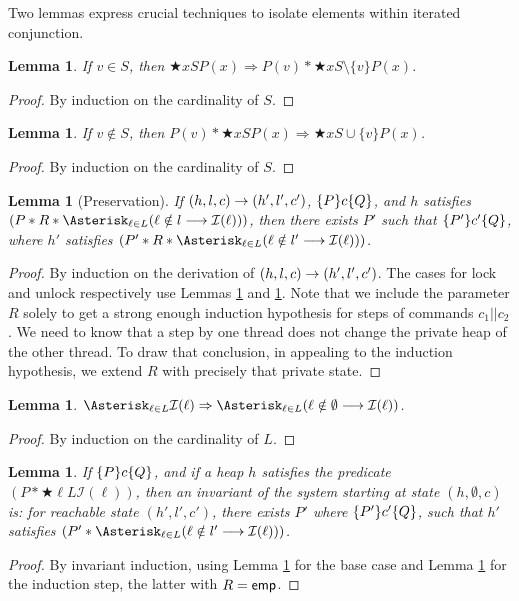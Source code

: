 \documentclass{amsbook}
\newtheorem{lemma}[theorem]{Lemma}
\theoremstyle{definition}
\theoremstyle{remark}
\numberwithin{section}{chapter}
\numberwithin{equation}{chapter}
\begin{document}
Two lemmas express crucial techniques to isolate elements within iterated conjunction.

\begin{lemma}\label{chunkslock}
  If $v \in S$, then $\bigstar{x}{S}{P(x)} \Rightarrow P(v) * \bigstar{x}{S \setminus \{v\}}{P(x)}$.
\end{lemma}
\begin{proof}
  By induction on the cardinality of $S$.
\end{proof}

\begin{lemma}\label{chunksunlock}
  If $v \notin S$, then $P(v) * \bigstar{x}{S}{P(x)} \Rightarrow \bigstar{x}{S \cup \{v\}}{P(x)}$.
\end{lemma}
\begin{proof}
  By induction on the cardinality of $S$.
\end{proof}

\begin{lemma}[Preservation]\label{cslpreservation}
  If $(h, l, c) \to (h', l', c')$, $\{P\} c \{Q\}$, and $h$ satisfies $(P * R * \bigstarp{\ell}{L}{\guarded{\ell \notin l}{\mathcal I(\ell)}})$, then there exists $P'$ such that $\{P'\} c' \{Q\}$, where $h'$ satisfies $(P' * R * \bigstarp{\ell}{L}{\guarded{\ell \notin l'}{\mathcal I(\ell)}})$.
\end{lemma}
\begin{proof}
  By induction on the derivation of $(h, l, c) \to (h', l', c')$.
  The cases for lock and unlock respectively use Lemmas \ref{chunkslock} and \ref{chunksunlock}.
  Note that we include the parameter $R$ solely to get a strong enough induction hypothesis for steps of commands $c_1 || c_2$.
  We need to know that a step by one thread does not change the private heap of the other thread.
  To draw that conclusion, in appealing to the induction hypothesis, we extend $R$ with precisely that private state.
\end{proof}

\begin{lemma}\label{nonelocked}
  $\bigstar{\ell}{L}{\mathcal I(\ell)} \Rightarrow \bigstarp{\ell}{L}{\guarded{\ell \notin \emptyset}{\mathcal I(\ell)}}$.
\end{lemma}
\begin{proof}
  By induction on the cardinality of $L$.
\end{proof}

\begin{lemma}\label{cslinvariant}
  If $\{P\} c \{Q\}$, and if a heap $h$ satisfies the predicate $(P * \bigstar{\ell}{L}{\mathcal I(\ell)})$, then an invariant of the system starting at state $(h, \emptyset, c)$ is: for reachable state $(h', l', c')$, there exists $P'$ where $\{P'\} c' \{Q\}$, such that $h'$ satisfies $(P' * \bigstarp{\ell}{L}{\guarded{\ell \notin l'}{\mathcal I(\ell)}})$.
\end{lemma}
\begin{proof}
  By invariant induction, using Lemma \ref{nonelocked} for the base case and Lemma \ref{cslpreservation} for the induction step, the latter with $R = \mathsf{emp}$.
\end{proof}
\end{document}

